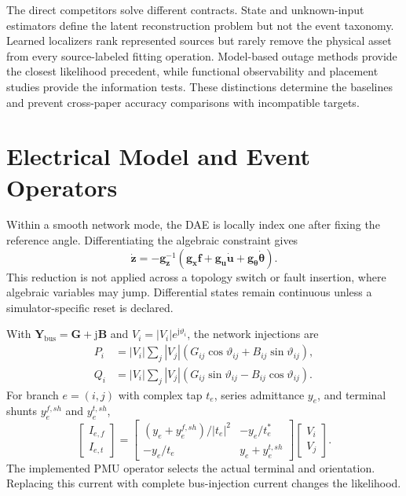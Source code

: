 \documentclass{ieeeaccess}
\begin{document}
The direct competitors solve different contracts. State and unknown-input estimators define the latent reconstruction problem but not the event taxonomy. Learned localizers rank represented sources but rarely remove the physical asset from every source-labeled fitting operation. Model-based outage methods provide the closest likelihood precedent, while functional observability and placement studies provide the information tests. These distinctions determine the baselines and prevent cross-paper accuracy comparisons with incompatible targets.

\section{Electrical Model and Event Operators}

Within a smooth network mode, the DAE is locally index one after fixing the reference angle. Differentiating the algebraic constraint gives
\begin{equation}
 \dot{\bm z}=-\bm g_{\bm z}^{-1}
 (\bm g_{\bm x}\bm f+\bm g_{\bm u}\dot{\bm u}
 +\bm g_{\bm\theta}\dot{\bm\theta}).
 \label{eq:supp-index-one}
\end{equation}
This reduction is not applied across a topology switch or fault insertion, where algebraic variables may jump. Differential states remain continuous unless a simulator-specific reset is declared.

With $\bm Y_{\mathrm{bus}}=\bm G+\mathrm j\bm B$ and $V_i=|V_i|e^{\mathrm j\vartheta_i}$, the network injections are
\begin{align}
 P_i&=|V_i|\sum_j|V_j|(G_{ij}\cos\vartheta_{ij}+B_{ij}\sin\vartheta_{ij}),\\
 Q_i&=|V_i|\sum_j|V_j|(G_{ij}\sin\vartheta_{ij}-B_{ij}\cos\vartheta_{ij}).
 \label{eq:supp-ac}
\end{align}
For branch $e=(i,j)$ with complex tap $t_e$, series admittance $y_e$, and terminal shunts $y_e^{f,sh}$ and $y_e^{t,sh}$,
\begin{equation}
 \begin{bmatrix}I_{e,f}\\I_{e,t}\end{bmatrix}=
 \begin{bmatrix}
 (y_e+y_e^{f,sh})/|t_e|^2&-y_e/t_e^*\\
 -y_e/t_e&y_e+y_e^{t,sh}
 \end{bmatrix}
 \begin{bmatrix}V_i\\V_j\end{bmatrix}.
 \label{eq:supp-terminal-current}
\end{equation}
The implemented PMU operator selects the actual terminal and orientation. Replacing this current with complete bus-injection current changes the likelihood.
\end{document}
